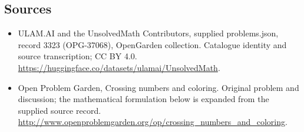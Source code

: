 \documentclass[11pt,a4paper]{article}
\begin{document}
\subsection{Sources}
\begin{itemize}
\item[S1] ULAM.AI and the UnsolvedMath Contributors, supplied problems.json, record 3323 (OPG-37068), OpenGarden collection. Catalogue identity and source transcription; CC BY 4.0.
\url{https://huggingface.co/datasets/ulamai/UnsolvedMath}.
\item[S2] Open Problem Garden, Crossing numbers and coloring. Original problem and discussion; the mathematical formulation below is expanded from the supplied source record.
\url{http://www.openproblemgarden.org/op/crossing_numbers_and_coloring}.

\end{itemize}
\end{document}
